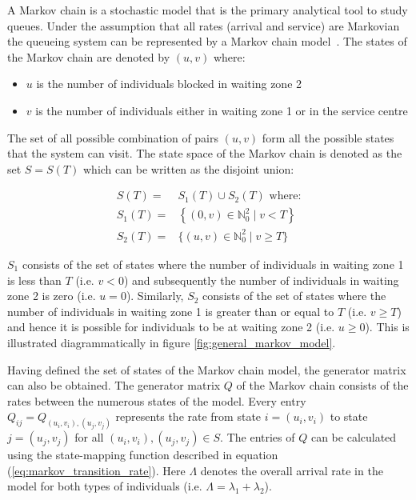 A Markov chain is a stochastic model that is the primary analytical tool to
study queues.
Under the assumption that all rates (arrival and service) are Markovian the
queueing system can be represented by a Markov chain
model~\cite{kemeny1976markov}.
The states of the Markov chain are denoted by \((u,v)\) where:

\begin{itemize}
    \item \(u\) is the number of individuals blocked in waiting zone 2
    \item \(v\) is the number of individuals either in waiting zone 1 or in the
    service centre
\end{itemize}

The set of all possible combination of pairs \((u, v)\) form all the possible
states that the system can visit.
The state space of the Markov chain is denoted as the set \(S=S(T)\) which can
be written as the disjoint union:

\begin{align}
    S(T) =& S_1(T) \cup S_2(T) \text{ where:} \nonumber \\
    S_1(T) =& \left\{(0, v)\in\mathbb{N}_0^2 \; | \; v < T \right\}
    \label{eq:definition_of_S_as_disjoint_union} \\
    S_2(T) =& \{(u, v)\in\mathbb{N}_0^2 \; | \; v \geq T \} \nonumber
\end{align}

\(S_1\) consists of the set of states where the number of individuals in waiting
zone 1 is less than \(T\) (i.e. \(v < 0\)) and subsequently the number of
individuals in waiting zone 2 is zero (i.e. \(u = 0\)).
Similarly, \(S_2\) consists of the set of states where the number of individuals
in waiting zone 1 is greater than or equal to \(T\) (i.e. \(v \geq T\)) and
hence it is possible for individuals to be at waiting zone 2 (i.e.
\(u \geq 0\)).
This is illustrated diagrammatically in figure \ref{fig:general_markov_model}.

Having defined the set of states of the Markov chain model, the generator
matrix can also be obtained.
The generator matrix \(Q\) of the Markov chain consists of the
rates between the numerous states of the model.
Every entry \( Q_{ij} = Q_{(u_i, v_i),(u_j, v_j)} \) represents the rate from
state \( i = (u_i, v_i) \) to state \( j = (u_j , v_j) \) for all
\( (u_i, v_i), (u_j, v_j) \in S \).
The entries of \(Q\) can be calculated using the state-mapping function
described in equation (\ref{eq:markov_transition_rate}).
Here \(\Lambda\) denotes the overall arrival rate in the model for
both types of individuals (i.e. \(\Lambda = \lambda_1 + \lambda_2\)).

